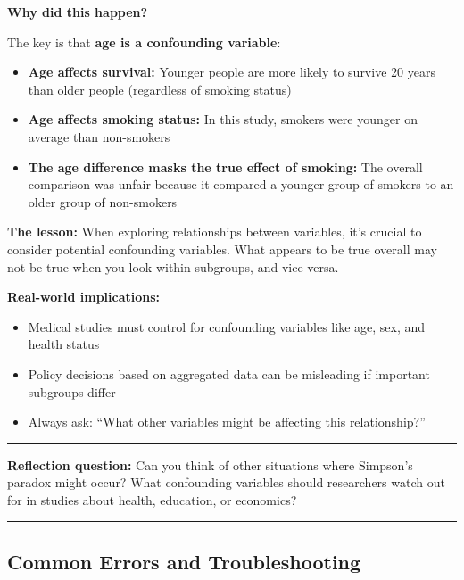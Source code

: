 \documentclass[]{tufte-handout}
\providecommand{\tightlist}{%
  \setlength{\itemsep}{0pt}\setlength{\parskip}{0pt}}
\begin{document}
\textbf{Why did this happen?}

The key is that \textbf{age is a confounding variable}:

\begin{itemize}
\tightlist
\item
  \textbf{Age affects survival:} Younger people are more likely to
  survive 20 years than older people (regardless of smoking status)
\item
  \textbf{Age affects smoking status:} In this study, smokers were
  younger on average than non-smokers
\item
  \textbf{The age difference masks the true effect of smoking:} The
  overall comparison was unfair because it compared a younger group of
  smokers to an older group of non-smokers
\end{itemize}

\textbf{The lesson:} When exploring relationships between variables,
it's crucial to consider potential confounding variables. What appears
to be true overall may not be true when you look within subgroups, and
vice versa.

\textbf{Real-world implications:}

\begin{itemize}
\tightlist
\item
  Medical studies must control for confounding variables like age, sex,
  and health status
\item
  Policy decisions based on aggregated data can be misleading if
  important subgroups differ
\item
  Always ask: ``What other variables might be affecting this
  relationship?''
\end{itemize}

\begin{center}\rule{0.5\linewidth}{0.5pt}\end{center}

\textbf{Reflection question:} Can you think of other situations where
Simpson's paradox might occur? What confounding variables should
researchers watch out for in studies about health, education, or
economics?

\begin{center}\rule{0.5\linewidth}{0.5pt}\end{center}

\subsection{Common Errors and
Troubleshooting}\label{common-errors-and-troubleshooting}
\end{document}
